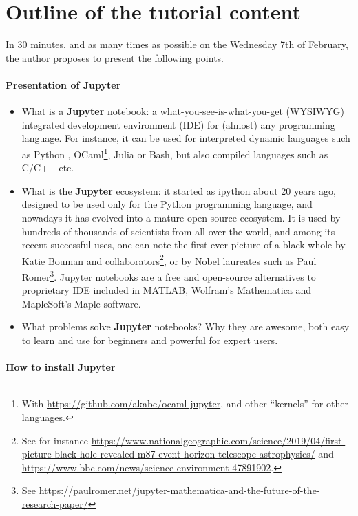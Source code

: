 \documentclass[runningheads]{llncs}
\newcommand{\Jupyter}{\textbf{Jupyter}}
\begin{document}
\section{Outline of the tutorial content}

In 30 minutes, and as many times as possible on the Wednesday 7th of February, the author proposes to present the following points.

\paragraph{Presentation of \Jupyter}

\begin{itemize}
    \item What is a \Jupyter{} notebook: a what-you-see-is-what-you-get (WYSIWYG) integrated development environment (IDE) for (almost) any programming language. For instance, it can be used for interpreted dynamic languages such as Python \cite{python}, OCaml\footnote{With \url{https://github.com/akabe/ocaml-jupyter}, and other ``kernels'' for other languages.}, Julia or Bash, but also compiled languages such as C/C++ etc.

    \item What is the \Jupyter{} ecosystem: it started as ipython \cite{ipython} about 20 years ago, designed to be used only for the Python programming language, and nowadays it has evolved into a mature open-source ecosystem.
    It is used by hundreds of thousands of scientists from all over the world, and among its recent successful uses, one can note the first ever picture of a black whole by Katie Bouman and collaborators\footnote{See for instance \url{https://www.nationalgeographic.com/science/2019/04/first-picture-black-hole-revealed-m87-event-horizon-telescope-astrophysics/} and \url{https://www.bbc.com/news/science-environment-47891902}.}, or by Nobel laureates such as Paul Romer\footnote{See \url{https://paulromer.net/jupyter-mathematica-and-the-future-of-the-research-paper/}}.
    Jupyter notebooks are a free and open-source alternatives to proprietary IDE included in MATLAB, Wolfram's Mathematica and MapleSoft's Maple software.

    \item What problems solve \Jupyter{} notebooks? Why they are awesome, both easy to learn and use for beginners and powerful for expert users.
\end{itemize}

\paragraph{How to install \Jupyter}
\end{document}
